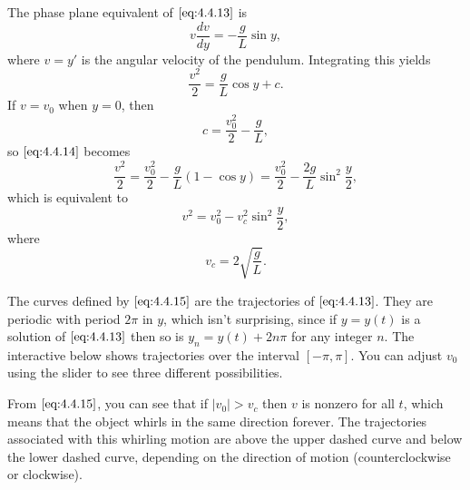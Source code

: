 \documentclass{ximera}
\begin{document}
\begin{example}
 
 
The phase plane equivalent of $\eqref{eq:4.4.13}$ is
$$
v\frac{dv}{dy}=-\frac{g}{L} \sin y,
$$
where $v=y'$ is the angular velocity of the pendulum. Integrating this
yields
\begin{equation}\label{eq:4.4.14}
\frac{v^2}{2}=\frac{g}{L}\cos y+c.
\end{equation}
If $v=v_0$ when $y=0$, then
$$
c=\frac{v_0^2}{2}-\frac{g}{L},
$$
so $\eqref{eq:4.4.14}$ becomes
$$
\frac{v^2}{2}=\frac{v_0^2}{2}-\frac{g}{L}(1-\cos y)
=\frac{v_0^2}{2}-\frac{2g}{L}\sin^2\frac{y}{2},
$$
which is equivalent to
\begin{equation}\label{eq:4.4.15}
v^2=v_0^2-v_c^2\sin^2\frac{y}{2},
\end{equation}
 where
$$
v_c=2\sqrt{\frac{g}{L}}.
$$
 
The curves defined by $\eqref{eq:4.4.15}$ are the trajectories of
$\eqref{eq:4.4.13}$. They are periodic with period $2\pi$ in $y$, which isn't
 surprising, since if $y=y(t)$ is a solution of $\eqref{eq:4.4.13}$ then
so is $y_n=y(t)+2n\pi$ for any integer $n$. The interactive below
shows trajectories over the interval $[-\pi,\pi]$.  You can adjust $v_0$ using the slider to see three different possibilities.

\begin{center}
\end{center}
 
 
 
From $\eqref{eq:4.4.15}$,
you can see that if $|v_0|>v_c$ then $v$ is nonzero for all $t$, which
means that the object whirls in the same direction forever. The trajectories associated with this
whirling motion are above the upper dashed curve and below the lower
dashed curve, depending on the direction of motion (counterclockwise or clockwise).

 

\end{example}
\end{document}
